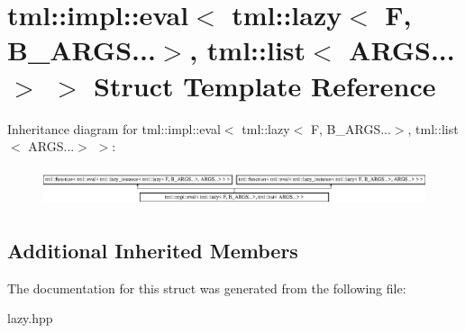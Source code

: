 \hypertarget{structtml_1_1impl_1_1eval_3_01tml_1_1lazy_3_01F_00_01B__ARGS_8_8_8_4_00_01tml_1_1list_3_01ARGS_8_8_8_4_01_4}{\section{tml\+:\+:impl\+:\+:eval$<$ tml\+:\+:lazy$<$ F, B\+\_\+\+A\+R\+G\+S...$>$, tml\+:\+:list$<$ A\+R\+G\+S...$>$ $>$ Struct Template Reference}
\label{structtml_1_1impl_1_1eval_3_01tml_1_1lazy_3_01F_00_01B__ARGS_8_8_8_4_00_01tml_1_1list_3_01ARGS_8_8_8_4_01_4}
}
Inheritance diagram for tml\+:\+:impl\+:\+:eval$<$ tml\+:\+:lazy$<$ F, B\+\_\+\+A\+R\+G\+S...$>$, tml\+:\+:list$<$ A\+R\+G\+S...$>$ $>$\+:\begin{figure}[H]
\begin{center}
\leavevmode
\includegraphics[height=1.138211cm]{structtml_1_1impl_1_1eval_3_01tml_1_1lazy_3_01F_00_01B__ARGS_8_8_8_4_00_01tml_1_1list_3_01ARGS_8_8_8_4_01_4}
\end{center}
\end{figure}
\subsection*{Additional Inherited Members}


The documentation for this struct was generated from the following file\+:\begin{DoxyCompactItemize}
\item 
lazy.\+hpp\end{DoxyCompactItemize}

